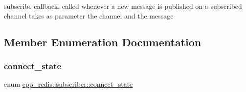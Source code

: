 subscribe callback, called whenever a new message is published on a subscribed channel takes as parameter the channel and the message 

\subsection{Member Enumeration Documentation}
\mbox{\label{classcpp__redis_1_1subscriber_afc976757efd9d0ac4def6935546a2338}} 
\subsubsection{\texorpdfstring{connect\+\_\+state}{connect\_state}}
{\footnotesize\ttfamily enum \hyperlink{classcpp__redis_1_1subscriber_afc976757efd9d0ac4def6935546a2338}{cpp\+\_\+redis\+::subscriber\+::connect\+\_\+state}\hspace{0.3cm}{\ttfamily [strong]}}

